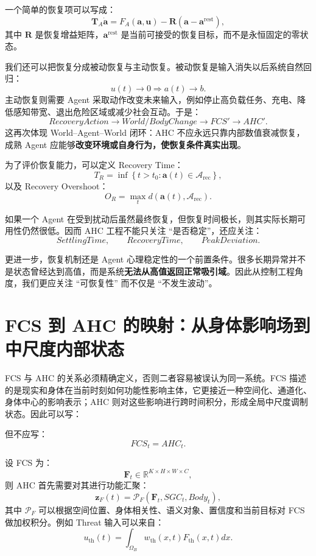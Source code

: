一个简单的恢复项可以写成：
\[
\mathbf T_A
\dot{\mathbf a}
=
F_A(\mathbf a,\mathbf u)
-
\mathbf R
(\mathbf a-\mathbf a^{\mathrm{rest}}),
\]
其中 $\mathbf R$ 是恢复增益矩阵，$\mathbf a^{\mathrm{rest}}$ 是当前可接受的恢复目标，而不是永恒固定的零状态。

我们还可以把恢复分成被动恢复与主动恢复。被动恢复是输入消失以后系统自然回归：
\[
u(t)\rightarrow0
\Rightarrow
a(t)\rightarrow b.
\]
主动恢复则需要 Agent 采取动作改变未来输入，例如停止高负载任务、充电、降低感知带宽、退出危险区域或减少社会互动。于是：
\[
RecoveryAction
\rightarrow
World/BodyChange
\rightarrow
FCS'
\rightarrow
AHC'.
\]
这再次体现 World--Agent--World 闭环：AHC 不应永远只靠内部数值衰减恢复，成熟 Agent 应能够\textbf{改变环境或自身行为，使恢复条件真实出现}。

为了评价恢复能力，可以定义 Recovery Time：
\[
T_R
=
\inf
\left\{
t>t_0:
\mathbf a(t)\in
\mathcal A_{\mathrm{rec}}
\right\},
\]
以及 Recovery Overshoot：
\[
O_R
=
\max_t
d(
\mathbf a(t),
\mathcal A_{\mathrm{rec}}
).
\]

如果一个 Agent 在受到扰动后虽然最终恢复，但恢复时间极长，则其实际长期可用性仍然很低。因而 AHC 工程不能只关注 ``是否稳定''，还应关注：
\[
SettlingTime,\qquad
RecoveryTime,\qquad
PeakDeviation.
\]

更进一步，恢复机制还是 Agent 心理稳定性的一个前置条件。很多长期异常并不是状态曾经达到高值，而是系统\textbf{无法从高值返回正常吸引域}。因此从控制工程角度，我们更应关注 ``可恢复性'' 而不仅是 ``不发生波动''。


\section{FCS 到 AHC 的映射：从身体影响场到中尺度内部状态}

FCS 与 AHC 的关系必须精确定义，否则二者容易被误认为同一系统。FCS 描述的是现实和身体在当前时刻如何功能性影响主体，它更接近一种空间化、通道化、身体中心的影响表示；AHC 则对这些影响进行跨时间积分，形成全局中尺度调制状态。因此可以写：
\begin{statementbox}
\centering
{}
\end{statementbox}
但不应写：
\[
FCS_t
=
AHC_t.
\]

设 FCS 为：
\[
\mathbf F_t
\in
\mathbb R^{K\times H\times W\times C},
\]
则 AHC 首先需要对其进行功能汇聚：
\[
\mathbf z_F(t)
=
\mathcal P_F(
\mathbf F_t,
SGC_t,
Body_t
),
\]
其中 $\mathcal P_F$ 可以根据空间位置、身体相关性、语义对象、置信度和当前目标对 FCS 做加权积分。例如 Threat 输入可以来自：
\[
u_{\mathrm{th}}(t)
=
\int_{\Omega_B}
w_{\mathrm{th}}(x,t)
F_{\mathrm{th}}(x,t)
dx.
\]


